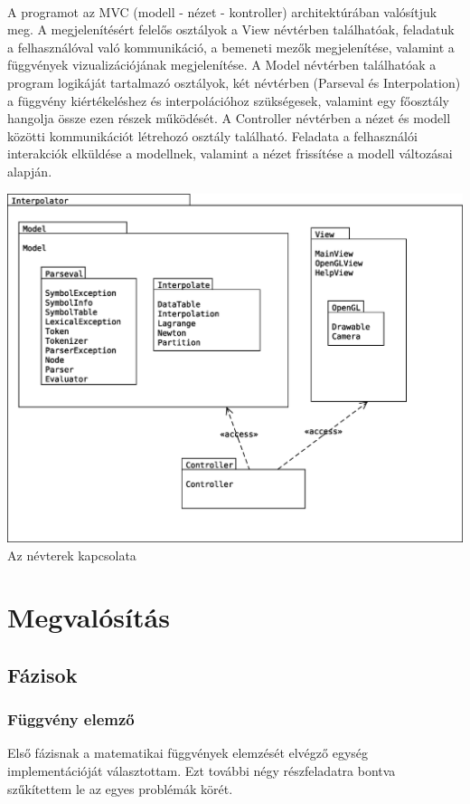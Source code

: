 \documentclass[12pt]{report}
\begin{document}
\paragraph{}
A programot az MVC (modell - nézet - kontroller) architektúrában valósítjuk meg. A megjelenítésért felelős osztályok a View névtérben találhatóak, feladatuk a felhasználóval való kommunikáció, a bemeneti mezők megjelenítése, valamint a függvények vizualizációjának megjelenítése. A Model névtérben találhatóak a program logikáját tartalmazó osztályok, két névtérben (Parseval és Interpolation) a függvény kiértékeléshez és interpolációhoz szükségesek, valamint egy főosztály hangolja össze ezen részek működését. A Controller névtérben a nézet és modell közötti kommunikációt létrehozó osztály található. Feladata a felhasználói interakciók elküldése a modellnek, valamint a nézet frissítése a modell változásai alapján.
\begin{center}
\includegraphics[width=14cm]{pics/uml/package}\\
{\footnotesize Az névterek kapcsolata}
\end{center}
\newpage

\section{Megvalósítás}
\subsection{Fázisok}
\subsubsection{Függvény elemző}
Első fázisnak a matematikai függvények elemzését elvégző egység implementációját választottam. Ezt további négy részfeladatra bontva szűkítettem le az egyes problémák körét.
\end{document}
